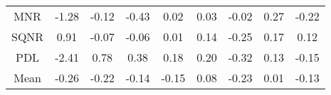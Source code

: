 \documentclass[11pt,a4paper]{report}
\begin{document}
\begin{longtable}{ | c || c | c | c | c | c | c | c || c |}
MNR &  \cellcolor[HTML]{FFDFDF} -1.28 &  \cellcolor[HTML]{FFFFFF} -0.12 &  \cellcolor[HTML]{FFF7F7} -0.43 &  \cellcolor[HTML]{FFFFFF} 0.02 &  \cellcolor[HTML]{FFFFFF} 0.03 &  \cellcolor[HTML]{FFFFFF} -0.02 &  \cellcolor[HTML]{F7F7FF} 0.27 &  \cellcolor[HTML]{FFF7F7} -0.22 \\
SQNR &  \cellcolor[HTML]{E7E7FF} 0.91 &  \cellcolor[HTML]{FFFFFF} -0.07 &  \cellcolor[HTML]{FFFFFF} -0.06 &  \cellcolor[HTML]{FFFFFF} 0.01 &  \cellcolor[HTML]{FFFFFF} 0.14 &  \cellcolor[HTML]{FFF7F7} -0.25 &  \cellcolor[HTML]{F7F7FF} 0.17 &  \cellcolor[HTML]{FFFFFF} 0.12 \\
PDL &  \cellcolor[HTML]{FFBFBF} -2.41 &  \cellcolor[HTML]{EFEFFF} 0.78 &  \cellcolor[HTML]{F7F7FF} 0.38 &  \cellcolor[HTML]{F7F7FF} 0.18 &  \cellcolor[HTML]{F7F7FF} 0.20 &  \cellcolor[HTML]{FFF7F7} -0.32 &  \cellcolor[HTML]{FFFFFF} 0.13 &  \cellcolor[HTML]{FFFFFF} -0.15 \\
\hline
\hline
Mean  &  \cellcolor[HTML]{FFF7F7} -0.26 &  \cellcolor[HTML]{FFF7F7} -0.22 &  \cellcolor[HTML]{FFFFFF} -0.14 &  \cellcolor[HTML]{FFFFFF} -0.15 &  \cellcolor[HTML]{FFFFFF} 0.08 &  \cellcolor[HTML]{FFF7F7} -0.23 &  \cellcolor[HTML]{FFFFFF} 0.01 &  \cellcolor[HTML]{FFFFFF} -0.13 \\
\hline
\end{longtable}
\end{document}
